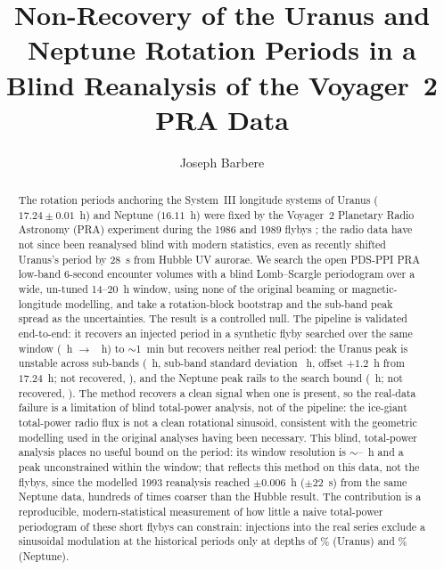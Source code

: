 \documentclass[twocolumn]{aastex631}
\begin{document}
\title{Non-Recovery of the Uranus and Neptune Rotation Periods in a Blind Reanalysis of
the Voyager~2 PRA Data}
\author[0009-0008-3289-4447]{Joseph Barbere}

\begin{abstract}
The rotation periods anchoring the System~III longitude systems of Uranus ($17.24\pm0.01$~h) and
Neptune ($16.11$~h) were fixed by the Voyager~2 Planetary Radio Astronomy (PRA) experiment during
the 1986 and 1989 flybys \citep{warwick1986,warwick1989}; the radio data have not since been
reanalysed blind with modern statistics, even as \citet{lamy2025} recently shifted Uranus's period
by 28~s from Hubble UV aurorae. We search the open PDS-PPI PRA low-band 6-second encounter volumes
\citep{pdsppi_vg2pra} with a blind Lomb--Scargle periodogram over a wide, un-tuned 14--20~h window,
using none of the original beaming or magnetic-longitude modelling, and take a rotation-block
bootstrap and the sub-band peak spread as the uncertainties. The result is a controlled null.
The pipeline is validated end-to-end: it recovers an injected
period in a synthetic flyby searched over the same window (\vgSynInjected~h $\to$
\vgSynRecovered~h) to $\sim$1~min but recovers neither real period: the Uranus peak is unstable across
sub-bands (\vgRealUPeriod~h, sub-band standard deviation \vgRealUSpread~h, offset $+1.2$~h from $17.24$~h; not
recovered, \vgRealURecovers), and the Neptune peak rails to the search bound (\vgRealNPeriod~h; not
recovered, \vgRealNRecovers). The method recovers a clean signal when one is present, so the
real-data failure is a limitation of blind total-power analysis, not of the pipeline: the
ice-giant total-power radio flux is not a clean rotational sinusoid, consistent with the geometric
modelling used in the original analyses having been necessary. This blind, total-power analysis places no useful bound on the period: its window resolution is
$\sim$\vgRealURes--\vgRealNRes~h and a peak unconstrained within the window; that reflects this
method on this data, not the flybys, since the modelled 1993 reanalysis reached $\pm 0.006$~h
($\pm 22$~s) from the same Neptune data, hundreds of times coarser than the Hubble result. The
contribution is a reproducible, modern-statistical measurement of how little a naive
total-power periodogram of these short flybys can constrain: injections into the real series
exclude a sinusoidal modulation at the historical periods only at depths of \vgRealUMinDepth\%
(Uranus) and \vgRealNMinDepth\% (Neptune).
\end{abstract}
\end{document}

